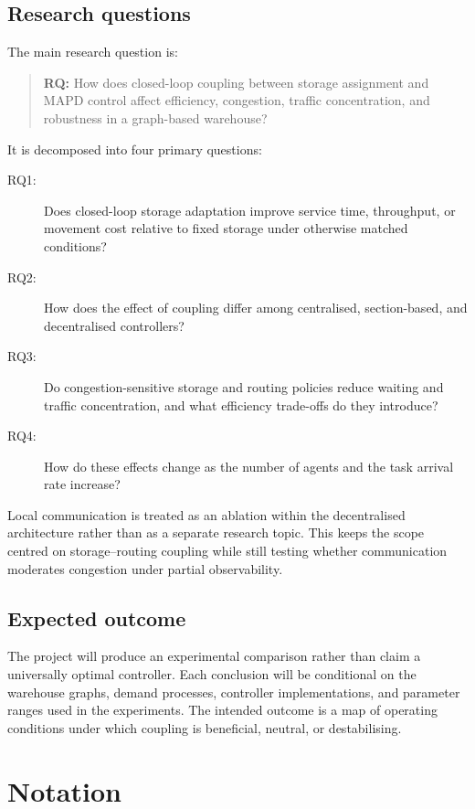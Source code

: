 \documentclass[../main.tex]{subfiles}
\begin{document}
\subsection{Research questions}

The main research question is:

\begin{quote}
\textbf{RQ:} How does closed-loop coupling between storage assignment and MAPD
control affect efficiency, congestion, traffic concentration, and robustness
in a graph-based warehouse?
\end{quote}

It is decomposed into four primary questions:
\begin{description}
  \item[RQ1:] Does closed-loop storage adaptation improve service time,
  throughput, or movement cost relative to fixed storage under otherwise
  matched conditions?
  \item[RQ2:] How does the effect of coupling differ among centralised,
  section-based, and decentralised controllers?
  \item[RQ3:] Do congestion-sensitive storage and routing policies reduce
  waiting and traffic concentration, and what efficiency trade-offs do they
  introduce?
  \item[RQ4:] How do these effects change as the number of agents and the task
  arrival rate increase?
\end{description}

Local communication is treated as an ablation within the decentralised
architecture rather than as a separate research topic. This keeps the scope
centred on storage--routing coupling while still testing whether communication
moderates congestion under partial observability.

\subsection{Expected outcome}

The project will produce an experimental comparison rather than claim a
universally optimal controller. Each conclusion will be conditional on the
warehouse graphs, demand processes, controller implementations, and parameter
ranges used in the experiments. The intended outcome is a map of operating
conditions under which coupling is beneficial, neutral, or destabilising.

\section{Notation}
\label{sec:notation}
\end{document}
